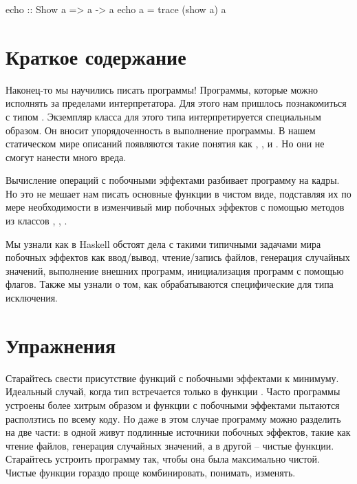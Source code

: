 \begin{code}
echo :: Show a => a -> a
echo a = trace (show a) a
\end{code}

\section{Краткое содержание}

Наконец-то мы научились писать программы! Программы, которые
можно исполнять за пределами интерпретатора. Для этого нам
пришлось познакомиться с типом . Экземпляр класса
 для этого типа интерпретируется специальным образом. 
Он вносит упорядоченность в выполнение программы. В нашем статическом
мире описаний появляются такие понятия как ,
,  и . Но они не смогут
нанести много вреда. 

Вычисление операций с побочными эффектами разбивает
программу на кадры. Но это не мешает нам писать основные
функции в чистом виде, подставляя их по мере необходимости
в изменчивый мир побочных эффектов 
с помощью методов из классов , ,
.

Мы узнали как в Haskell обстоят дела с такими типичными
задачами мира побочных эффектов как ввод/вывод, чтение/запись файлов,
генерация случайных значений, выполнение внешних программ,
инициализация программ с помощью флагов. Также мы узнали
о том, как обрабатываются специфические для типа  
исключения.


\section{Упражнения}

Старайтесь свести присутствие функций с побочными 
эффектами к минимуму. Идеальный случай, когда тип 
встречается только в функции . Часто программы
устроены более хитрым образом и функции с побочными 
эффектами пытаются расползтись по всему коду. Но даже
в этом случае программу можно разделить на две части:
в одной живут подлинные источники побочных эффектов, 
такие как чтение файлов, генерация случайных значений,
а в другой -- чистые функции. Старайтесь устроить программу
так, чтобы она была максимально чистой. Чистые функции
гораздо проще комбинировать, понимать, изменять.  

